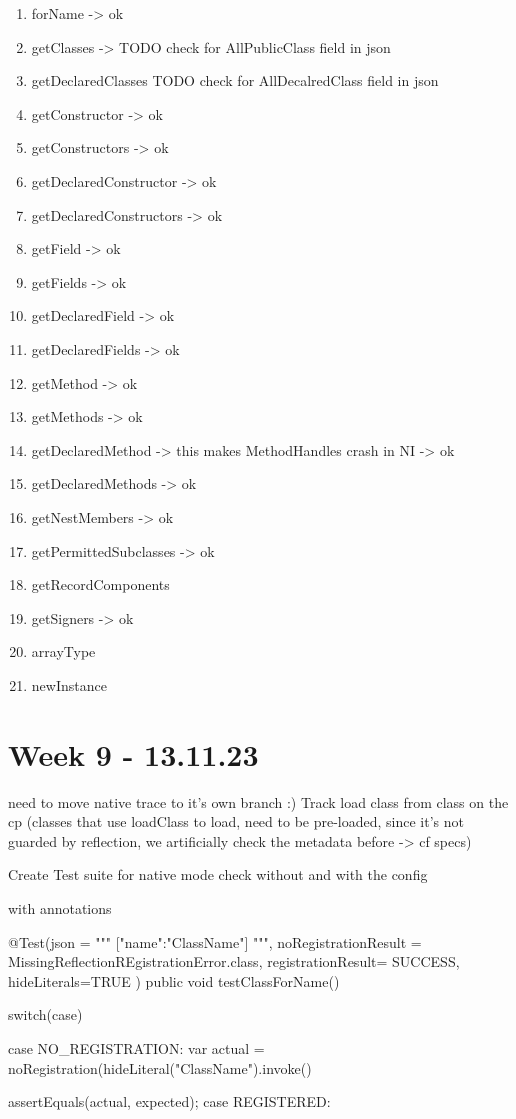 \begin{enumerate}
    \item forName -> ok
    \item getClasses -> TODO check for AllPublicClass field in json
    \item getDeclaredClasses TODO check for AllDecalredClass field in json
    \item getConstructor -> ok
    \item getConstructors -> ok
    \item getDeclaredConstructor -> ok
    \item getDeclaredConstructors -> ok
    \item getField -> ok
    \item getFields -> ok
    \item getDeclaredField -> ok
    \item getDeclaredFields -> ok
    \item getMethod -> ok
    \item getMethods -> ok
    \item getDeclaredMethod -> this makes MethodHandles crash in NI -> ok
    \item getDeclaredMethods -> ok
    \item getNestMembers -> ok
    \item getPermittedSubclasses -> ok
    \item getRecordComponents
    \item getSigners -> ok
    \item arrayType
    \item newInstance
\end{enumerate}

\section{Week 9 - 13.11.23}
need to move native trace to it's own branch :)
Track load class from class on the cp (classes that use loadClass to load, need to be pre-loaded, since it's not guarded by reflection, we artificially check the metadata before -> cf specs)

Create Test suite for native mode
check without and with the config

with annotations

@Test(json = """
[{"name":"ClassName"}]
""", noRegistrationResult = MissingReflectionREgistrationError.class, registrationResult= SUCCESS,
hideLiterals=TRUE
)
public void testClassForName() {
    switch(case) {
        case NO_REGISTRATION:
            var actual = noRegistration(hideLiteral("ClassName").invoke()

            assertEquals(actual, expected);
        case REGISTERED:
    }
}




